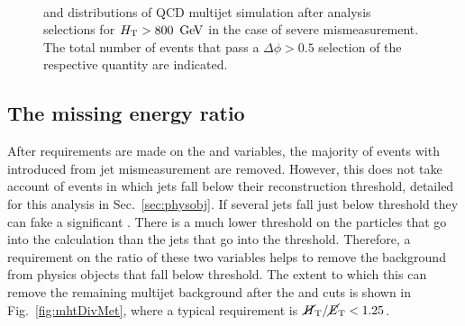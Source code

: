 \begin{figure}[!h]
 \centering
  \\
 \caption{\bdphi and \dphimhtj distributions of QCD multijet simulation
 after analysis selections for $\mbox{$H_\text{T}$}>800~\mathrm{\,Ge\kern -0.1em V}$ in the case of
 severe mismeasurement. The
 total number of events that pass a $\Delta\phi > 0.5$ selection of the
 respective quantity are indicated. }
 \label{fig:bDPhi_mismeasured}
\end{figure}

\subsection{The missing energy ratio \mhtmet}
\label{sec:mhtmet}

After requirements are made on the \alphat and \bdphi variables, the
majority of events with \MHT introduced from jet mismeasurement are
removed. However, this does not take account of events in which jets
fall below their reconstruction threshold, detailed for this analysis
in Sec.~\ref{sec:physobj}. If several jets fall just below threshold
they can fake a significant \MHT. There is a much lower threshold
on the particles that go into the \MET calculation than the jets that
go into the \MHT threshold. Therefore, a requirement on the ratio of
these two variables helps to remove the background from physics
objects 
that fall below threshold. The extent to which this can remove the
remaining \QCD multijet background after the \alphat and \bdphi cuts
is shown in Fig.~\ref{fig:mhtDivMet}, where a typical requirement is
$\mbox{$\mbox{$\cancel{H}_\text{T}$} / \mbox{$\cancel{E}_\text{T}$}$}<1.25$.

